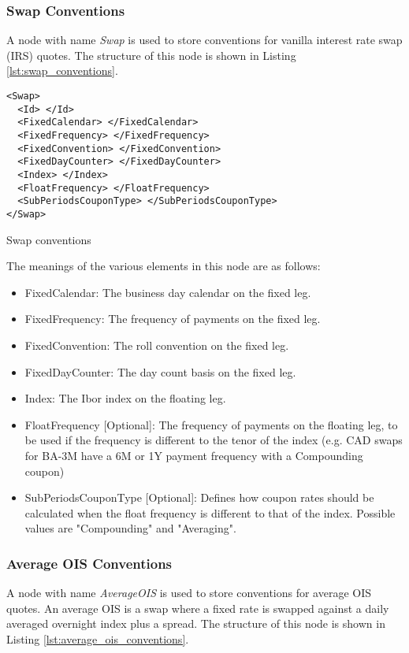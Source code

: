 \subsubsection{Swap Conventions}
A node with name \emph{Swap} is used to store conventions for vanilla interest rate swap (IRS) quotes. The structure of
this node is shown in Listing \ref{lst:swap_conventions}.

\begin{listing}[H]
\begin{verbatim}
<Swap>
  <Id> </Id>
  <FixedCalendar> </FixedCalendar>
  <FixedFrequency> </FixedFrequency>
  <FixedConvention> </FixedConvention>
  <FixedDayCounter> </FixedDayCounter>
  <Index> </Index>
  <FloatFrequency> </FloatFrequency>
  <SubPeriodsCouponType> </SubPeriodsCouponType>
</Swap>
\end{verbatim}
\caption{Swap conventions}
\label{lst:swap_conventions}
\end{listing}

The meanings of the various elements in this node are as follows:
\begin{itemize}
\item FixedCalendar: The business day calendar on the fixed leg.
\item FixedFrequency: The frequency of payments on the fixed leg.
\item FixedConvention: The roll convention on the fixed leg.
\item FixedDayCounter: The day count basis on the fixed leg.
\item Index: The Ibor index on the floating leg.
\item FloatFrequency [Optional]: The frequency of payments on the floating leg, to be used if the frequency is different to the tenor of the index (e.g. CAD swaps for BA-3M have a 6M or 1Y payment frequency with a Compounding coupon)
\item SubPeriodsCouponType [Optional]: Defines how coupon rates should be calculated when the float frequency is different to that of the index. Possible values are "Compounding" and "Averaging".
\end{itemize}

\subsubsection{Average OIS Conventions}
A node with name \emph{AverageOIS} is used to store conventions for average OIS quotes. An average OIS is a swap where a
fixed rate is swapped against a daily averaged overnight index plus a spread. The structure of this node is shown in
Listing \ref{lst:average_ois_conventions}.

